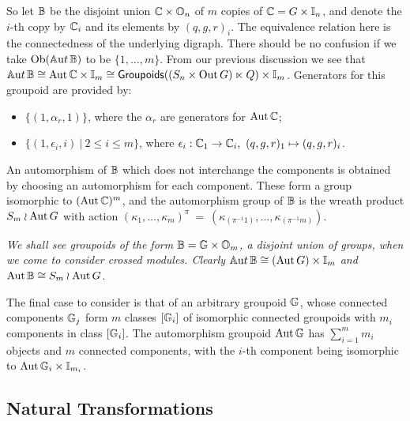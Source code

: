 So let $\mathbb{B}$ be the disjoint union $\mathbb{C} \times \mathbb{O}_n$ 
of $m$ copies of $\mathbb{C} = G \times \mathbb{I}_n$, 
and denote the $i$-th copy by $\mathbb{C}_i$ and its elements by $(q,g,r)_i$. 
The equivalence relation here is the connectedness of the underlying digraph. 
There should be no confusion if we take $\mathrm{Ob}(\mathbb{A}{\mathrm ut}\,\mathbb{B})$ 
to be $\{1,\ldots,m\}$. 
From our previous discussion we see that 
$\mathbb{A}{\mathrm ut}\,\mathbb{B} \cong \mathrm{Aut}\,\mathbb{C} \times \mathbb{I}_m 
              \cong {\sf Groupoids}((S_n \times \mathrm{Out}\,G) \ltimes Q) \times \mathbb{I}_m$. 
Generators for this groupoid are provided by: 
\begin{itemize}
\item
$\{(1,\alpha_r,1)\}$, where the $\alpha_r$ are generators for $\mathrm{Aut}\,\mathbb{C}$; 
\item
$\{(1,\epsilon_i,i) ~|~ 2 \leqslant i \leqslant m\}$, 
where $\epsilon_i : \mathbb{C}_1 \to \mathbb{C}_i,~ (q,g,r)_1 \mapsto (q,g,r)_i$. 
\end{itemize}

An automorphism of $\mathbb{B}$ which does not interchange the components 
is obtained by choosing an automorphism for each component.
These form a group isomorphic to $(\mathrm{Aut}\,\mathbb{C})^m$, 
and the automorphism group of $\mathbb{B}$ is the wreath product 
$S_m \wr \mathrm{Aut}\,G$ with action 
$(\kappa_1,\ldots,\kappa_m)^{\pi} ~=~ 
 (\kappa_{(\pi^{-1}1)},\ldots,\kappa_{(\pi^{-1}m)})$. 

\begin{example}
\emph{We shall see groupoids of the form $\mathbb{B} = \mathbb{G} \times \mathbb{O}_m$, 
a disjoint union of groups, when we come to consider crossed modules. 
Clearly $\mathbb{A}{\mathrm ut}\,\mathbb{B} \cong (\mathrm{Aut}\,G) \times \mathbb{I}_m$ 
and $\mathrm{Aut}\,\mathbb{B} \cong S_m \wr \mathrm{Aut}\,G$. 
}\end{example} 

\bigskip 
The final case to consider is that of an arbitrary groupoid $\mathbb{G}$, 
whose connected components $\mathbb{G}_j$ form $m$ classes $[\mathbb{G}_i]$ of 
isomorphic connected groupoids with $m_i$ components in class $[\mathbb{G}_i]$. 
The automorphism groupoid $\mathrm{Aut}\,\mathbb{G}$ has $\sum_{i=1}^m m_i$ objects 
and $m$ connected components, with the $i$-th component being isomorphic 
to $\mathrm{Aut}\,\mathbb{G}_i \times \mathbb{I}_{m_i}$. 


\newpage
\subsection{Natural Transformations}

